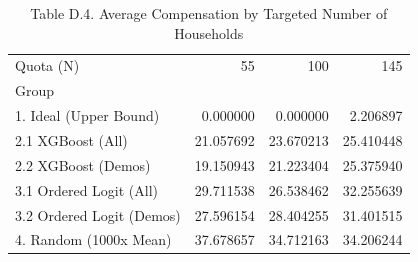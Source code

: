 \begin{table}
\caption{Table D.4. Average Compensation by Targeted Number of Households}
\begin{tabular}{lrrr}
\toprule
Quota (N) & 55 & 100 & 145 \\
Group &  &  &  \\
\midrule
1. Ideal (Upper Bound) & 0.000000 & 0.000000 & 2.206897 \\
2.1 XGBoost (All) & 21.057692 & 23.670213 & 25.410448 \\
2.2 XGBoost (Demos) & 19.150943 & 21.223404 & 25.375940 \\
3.1 Ordered Logit (All) & 29.711538 & 26.538462 & 32.255639 \\
3.2 Ordered Logit (Demos) & 27.596154 & 28.404255 & 31.401515 \\
4. Random (1000x Mean) & 37.678657 & 34.712163 & 34.206244 \\
\bottomrule
\end{tabular}
\end{table}
